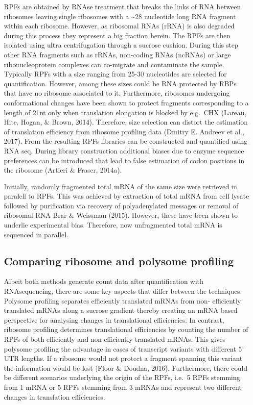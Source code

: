 \documentclass[
  12pt,
  openany]{book}
\begin{document}
RPFs are obtained by RNAse treatment that breaks the links of RNA between ribosomes leaving single ribosomes with a \textasciitilde28 nucleotide long RNA fragment within each ribosome. However, as ribosomal RNAs (rRNA) is also degraded during this process they represent a big fraction herein. The RPFs are then isolated using ultra centrifugation through a sucrose cushion. During this step other RNA fragments such as rRNAs, non-coding RNAs (ncRNAs) or large ribonucleoprotein complexes can co-migrate and contaminate the sample. Typically RPFs with a size ranging from 25-30 nucleotides are selected for quantification. However, among these sizes could be RNA protected by RBPs that have no ribosome associated to it. Furthermore, ribosomes undergoing conformational changes have been shown to protect fragments corresponding to a length of 21nt only when translation elongation is blocked by e.g.~CHX (Lareau, Hite, Hogan, \& Brown, 2014). Therefore, size selection can distort the estimation of translation efficiency from ribosome profiling data (Dmitry E. Andreev et al., 2017). From the resulting RPFs libraries can be constructed and quantified using RNA seq. During library construction additional biases due to enzyme sequence preferences can be introduced that lead to false estimation of codon positions in the ribosome (Artieri \& Fraser, 2014a).

Initially, randomly fragmented total mRNA of the same size were retrieved in paralell to RPFs. This was achieved by extraction of total mRNA from cell lysate followed by purification via recovery of polyadenylated messages or removal of ribosomal RNA Brar \& Weissman (2015). However, these have been shown to underlie experimental bias. Therefore, now unfragmented total mRNA is sequenced in parallel.

\subsection{Comparing ribosome and polysome profiling}

Albeit both methods generate count data after quantification with RNAsequencing, there are some key aspects that differ between the techniques. Polysome profiling separates efficiently translated mRNAs from non- efficiently translated mRNAs along a sucrose gradient thereby creating an mRNA based perspective for analysing changes in translational efficiencies. In contrast, ribosome profiling determines translational efficiencies by counting the number of RPFs of both efficiently and non-efficiently translated mRNAs. This gives polysome profiling the advantage in cases of transcript variants with different 5' UTR lengths. If a ribosome would not protect a fragment spanning this variant the information would be lost (Floor \& Doudna, 2016). Furthermore, there could be different scenarios underlying the origin of the RPFs, i.e.~5 RPFs stemming from 1 mRNA or 5 RPFs stemming from 3 mRNAs and represent two different changes in translation efficiencies.
\end{document}

